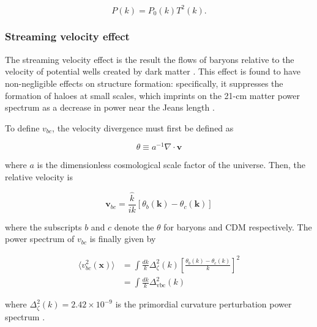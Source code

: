 \documentclass[floats,floatfix,showpacs,amssymb,prd,superscriptaddress,nofootinbib]{revtex4-2} %
\newcommand{\red}{\textcolor{red}}
\begin{document}
\begin{equation}
    P(k) = P_0 (k) T^2 (k).
    \label{eq:processed_power_spectrum}
\end{equation}

\subsubsection{Streaming velocity effect}
The streaming velocity effect is the result the flows of baryons relative to the velocity of potential wells created by dark matter \citep{Tseliakhovich_Hirata_2010}. This effect is found to have non-negligible effects on structure formation: specifically, it suppresses the formation of haloes at small scales, which imprints on the 21-cm matter power spectrum as a decrease in power near the Jeans length \citep{Tseliakhovich_Hirata_2010}. 

To define $v_{bc}$, the velocity divergence must first be defined as 

\begin{equation}
    \theta \equiv a^{-1} \nabla \cdot \textbf{v}
    \label{eq:velocity_divergence}
\end{equation}

\noindent where $a$ is the dimensionless cosmological scale factor of the universe. 
Then, the relative velocity is

\begin{equation}
    \textbf{v}_{bc} = \frac{\hat{k}}{ik} \left[ \theta_b (\textbf{k}) - \theta_c (\textbf{k}) \right]
    \label{eq:vbc_definition}
\end{equation}

\noindent where the subscripts $b$ and $c$ denote the $\theta$ for baryons and CDM respectively. The power spectrum of $v_{bc}$ is finally given by 

\begin{equation}
\begin{split}
        \langle v_{bc}^2 (\textbf{x}) \rangle 
        & = \int \frac{dk}{k} \Delta_\zeta^2 (k) \left[ \frac{\theta_b (k) - \theta_c (k)}{k} \right]^2 \\
        & = \int \frac{dk}{k} \Delta_{\text{vbc}}^2 (k)
\end{split}
\end{equation}

\noindent where $\Delta_\zeta ^2 (k) = 2.42 \times 10^{-9}$ is the primordial curvature perturbation power spectrum \citep{Dunkley_2009}.
\end{document}
